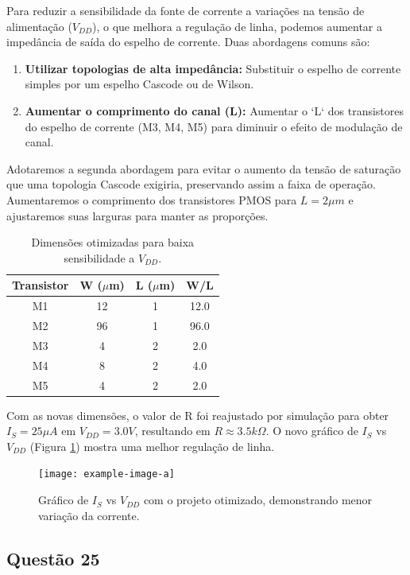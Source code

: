 ﻿\documentclass[12pt,a4paper]{article}
\begin{document}
Para reduzir a sensibilidade da fonte de corrente a variações na tensão de alimentação ($V_{DD}$), o que melhora a regulação de linha, podemos aumentar a impedância de saída do espelho de corrente. Duas abordagens comuns são:
\begin{enumerate}
    \item \textbf{Utilizar topologias de alta impedância:} Substituir o espelho de corrente simples por um espelho Cascode ou de Wilson.
    \item \textbf{Aumentar o comprimento do canal (L):} Aumentar o `L` dos transistores do espelho de corrente (M3, M4, M5) para diminuir o efeito de modulação de canal.
\end{enumerate}

Adotaremos a segunda abordagem para evitar o aumento da tensão de saturação que uma topologia Cascode exigiria, preservando assim a faixa de operação. Aumentaremos o comprimento dos transistores PMOS para $L=2\mu m$ e ajustaremos suas larguras para manter as proporções.

\begin{table}[H]
\centering
\caption{Dimensões otimizadas para baixa sensibilidade a $V_{DD}$.}
\label{tab:dimensoes_otimizadas}
\begin{tabular}{cccc}
\toprule
\textbf{Transistor} & \textbf{W ($\mu$m)} & \textbf{L ($\mu$m)} & \textbf{W/L} \\
\midrule
M1 & 12 & 1 & 12.0 \\
M2 & 96 & 1 & 96.0 \\
M3 & 4  & 2 & 2.0  \\
M4 & 8  & 2 & 4.0  \\
M5 & 4  & 2 & 2.0  \\
\bottomrule
\end{tabular}
\end{table}

Com as novas dimensões, o valor de R foi reajustado por simulação para obter $I_S = 25\mu A$ em $V_{DD} = 3.0V$, resultando em $R \approx 3.5k\Omega$. O novo gráfico de $I_S$ vs $V_{DD}$ (Figura \ref{fig:is_vdd_otimizado}) mostra uma melhor regulação de linha.

\begin{figure}[H]
\centering
\texttt{[image: example-image-a]}
\caption{Gráfico de $I_S$ vs $V_{DD}$ com o projeto otimizado, demonstrando menor variação da corrente.}
\label{fig:is_vdd_otimizado}
\end{figure}


\subsection*{Questão 25}
\end{document}

